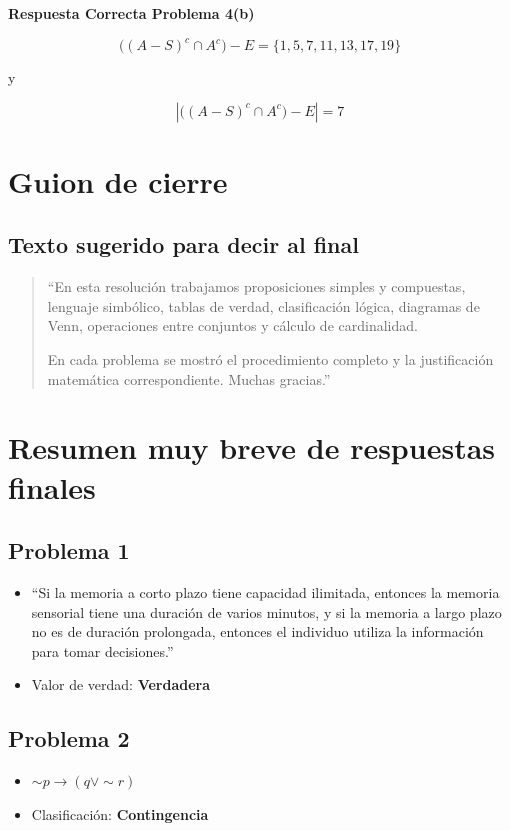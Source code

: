 \documentclass[12pt]{article}
\begin{document}
	\textbf{Respuesta Correcta Problema 4(b)}
	
	\[
	\big((A-S)^c\cap A^c\big)-E=\{1,5,7,11,13,17,19\}
	\]
	
	y
	
	\[
	\left|\big((A-S)^c\cap A^c\big)-E\right|=7
	\]
	
	\section*{Guion de cierre}
	
	\subsection*{Texto sugerido para decir al final}
	
	\begin{quote}
		“En esta resolución trabajamos proposiciones simples y compuestas, lenguaje simbólico, tablas de verdad, clasificación lógica, diagramas de Venn, operaciones entre conjuntos y cálculo de cardinalidad.
		
		En cada problema se mostró el procedimiento completo y la justificación matemática correspondiente. Muchas gracias.”
	\end{quote}
	
	\section*{Resumen muy breve de respuestas finales}
	
	\subsection*{Problema 1}
	\begin{itemize}
		\item[a)] “Si la memoria a corto plazo tiene capacidad ilimitada, entonces la memoria sensorial tiene una duración de varios minutos, y si la memoria a largo plazo no es de duración prolongada, entonces el individuo utiliza la información para tomar decisiones.”
		\item[b)] Valor de verdad: \textbf{Verdadera}
	\end{itemize}
	
	\subsection*{Problema 2}
	\begin{itemize}
		\item[a)] \(\sim p\to(q\lor \sim r)\)
		\item[b)] Clasificación: \textbf{Contingencia}
	\end{itemize}
	
\end{document}
